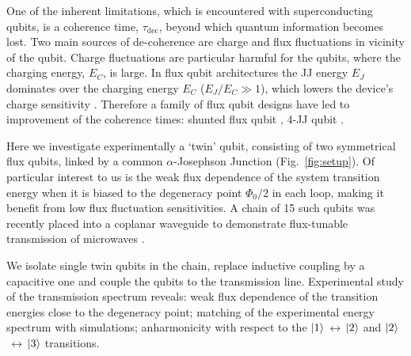 \documentclass[%
reprint,
superscriptaddress,
bibnotes,
amsmath,
amssymb,
aps,
showkeys,
prb,
]{revtex4-2}
\newcommand{\iket}[1]{\ensuremath{\Ket{#1}}}
\newcommand{\ilra}{\ensuremath{\,\leftrightarrow\,}}
\begin{document}
One  of the  inherent limitations,  which  is encountered with superconducting qubits, is  a coherence  time,
$\tau_{\text{dec}}$, beyond  which quantum information  becomes lost. Two main sources of de-coherence are charge and flux fluctuations in vicinity of the qubit. Charge fluctuations are particular harmful for the qubits, where the charging energy, $E_C$, is large. In  flux qubit
architectures the JJ  energy $E_J$ dominates over  the charging energy $E_C$  ($E_J/E_C \gg 1$),
which lowers  the device's  charge sensitivity  \cite{Orlando_1999,Chiorescu_2003,Mooij_1999}. Therefore a
family  of flux qubit designs  have led to  improvement of the coherence  times: shunted
flux qubit \cite{Yan_2016} , 4-JJ qubit \cite{Qiu_2016,Pop_2014}.


Here we investigate experimentally a `twin'  qubit, consisting of two symmetrical flux qubits,
linked by a common $ \alpha$-Josephson Junction  (Fig.~\ref{fig:setup}).  Of particular interest to us is the weak flux dependence of the
system transition  energy when  it is  biased to the  degeneracy point  $\Phi_0/2 $ in each loop,  making it
benefit from low flux fluctuation sensitivities. A chain of 15 such qubits
was recently  placed into  a coplanar  waveguide to  demonstrate flux-tunable  transmission of
microwaves \cite{Shulga_2018}.  
 
We  isolate single twin qubits in the chain, replace inductive coupling by a capacitive one and couple the qubits to the  transmission line. Experimental study of the transmission spectrum reveals: weak flux
dependence  of the  transition  energies close  to  the degeneracy  point;
matching of  the
experimental   energy   spectrum   with   simulations; anharmonicity
with respect  to the  \iket{1}\ilra\iket{2} and  \iket{2}\ilra\iket{3} transitions.
\end{document}
